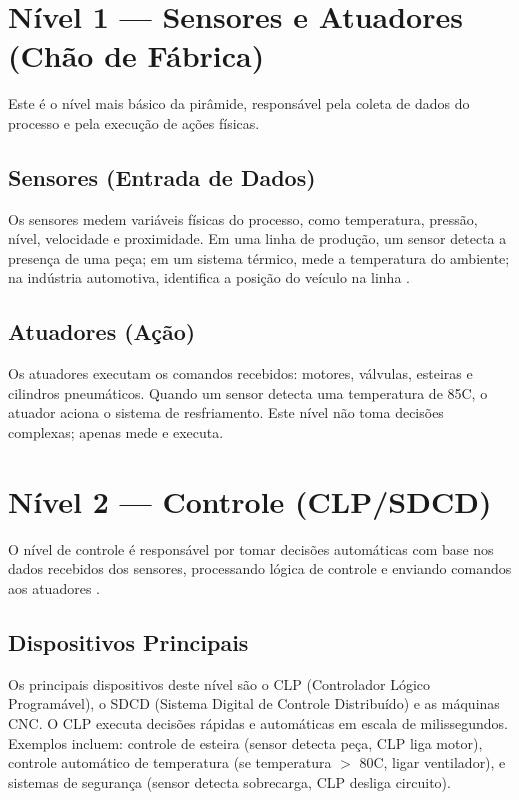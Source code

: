 \documentclass[12pt,a4paper,oneside]{article}
\begin{document}
\section{Nível 1 --- Sensores e Atuadores (Chão de Fábrica)}

Este é o nível mais básico da pirâmide, responsável pela coleta de dados do processo e pela execução de ações físicas.

\subsection{Sensores (Entrada de Dados)}

Os sensores medem variáveis físicas do processo, como temperatura, pressão, nível, velocidade e proximidade. Em uma linha de produção, um sensor detecta a presença de uma peça; em um sistema térmico, mede a temperatura do ambiente; na indústria automotiva, identifica a posição do veículo na linha \cite{lara2021}.

\subsection{Atuadores (Ação)}

Os atuadores executam os comandos recebidos: motores, válvulas, esteiras e cilindros pneumáticos. Quando um sensor detecta uma temperatura de 85\textdegree C, o atuador aciona o sistema de resfriamento. Este nível não toma decisões complexas; apenas mede e executa.

\section{Nível 2 --- Controle (CLP/SDCD)}

O nível de controle é responsável por tomar decisões automáticas com base nos dados recebidos dos sensores, processando lógica de controle e enviando comandos aos atuadores \cite{albuquerque2009}.

\subsection{Dispositivos Principais}

Os principais dispositivos deste nível são o CLP (Controlador Lógico Programável), o SDCD (Sistema Digital de Controle Distribuído) e as máquinas CNC. O CLP executa decisões rápidas e automáticas em escala de milissegundos. Exemplos incluem: controle de esteira (sensor detecta peça, CLP liga motor), controle automático de temperatura (se temperatura $>$ 80\textdegree C, ligar ventilador), e sistemas de segurança (sensor detecta sobrecarga, CLP desliga circuito).
\end{document}
